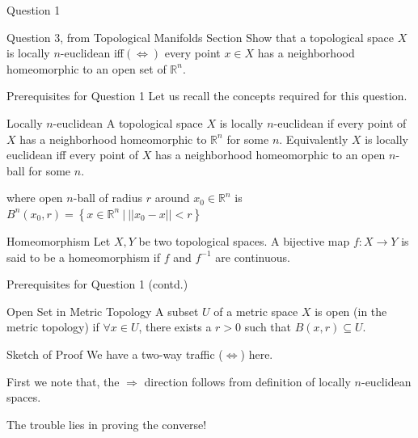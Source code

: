\documentclass{beamer}
\begin{document}
\begin{frame}{Question 1}
\begin{block}{Question 3, from Topological Manifolds Section}
Show that a topological space $\displaystyle X$ is locally $n$-euclidean iff$\displaystyle ( \Leftrightarrow )$ every point $\displaystyle x\in X$ has a neighborhood homeomorphic to an open set of $\displaystyle \mathbb{R}^{n}$.
\end{block}
\end{frame}

\begin{frame}{Prerequisites for Question 1}
Let us recall the concepts required for this question.
\begin{block}{Locally $\displaystyle n$-euclidean}
A topological space $\displaystyle X$ is \alert{locally $n$-euclidean} if every point of $\displaystyle X$ has a neighborhood homeomorphic to $\displaystyle \mathbb{R}^{n}$ for some $\displaystyle n$.
Equivalently $\displaystyle X$ is locally euclidean iff every point of $\displaystyle X$ has a neighborhood homeomorphic to an open $\displaystyle n$-ball for some $\displaystyle n$.
\end{block} 
where open $\displaystyle n$-ball of radius $\displaystyle r$ around $\displaystyle x_{0} \in \mathbb{R}^{n}$ is $\displaystyle B^{n}( x_{0} ,r) =\left\{x\in \mathbb{R}^{n} \ |\ ||x_{0} -x||< r\right\}$ 
\begin{block}{Homeomorphism}
Let $\displaystyle X,Y$ be two topological spaces. A bijective map $\displaystyle f:X\rightarrow Y$ is said to be a \alert{homeomorphism} if $\displaystyle f$ and $\displaystyle f^{-1}$ are continuous. 
\end{block}
\end{frame}
\begin{frame}{Prerequisites for Question 1 (contd.)}
\begin{block}{Open Set in Metric Topology}
A subset $\displaystyle U$ of a metric space $\displaystyle X$ is open (in the metric topology) if $\displaystyle \forall x\in U$, there exists a $\displaystyle r >0$ such that $\displaystyle B( x,r) \subseteq U$.
\end{block}
\end{frame}
\begin{frame}{Sketch of Proof}
We have a two-way traffic ($\displaystyle \Leftrightarrow $) here. 

First we note that, the $\displaystyle \Rightarrow $ direction follows from definition of locally $\displaystyle n$-euclidean spaces. 

\alert{The trouble lies in proving the converse!}
\end{frame}
\end{document}
